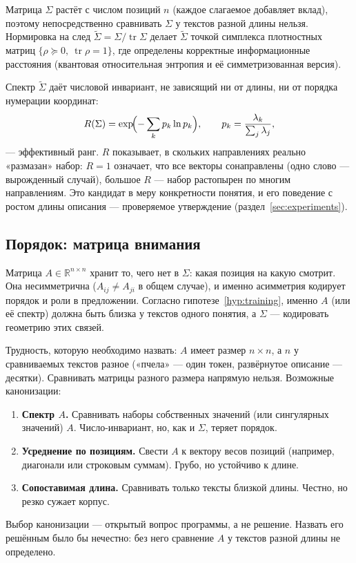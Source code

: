 \documentclass[11pt,a4paper]{article}
\theoremstyle{definition}
\theoremstyle{plain}
\newcommand{\R}{\mathbb{R}}
\DeclareMathOperator{\tr}{tr}
\begin{document}
Матрица $\Sigma$ растёт с числом позиций $n$ (каждое слагаемое добавляет вклад), поэтому
непосредственно сравнивать $\Sigma$ у текстов разной длины нельзя. Нормировка на след
$\tilde\Sigma=\Sigma/\tr\Sigma$ делает $\tilde\Sigma$ точкой симплекса плотностных матриц
$\{\rho\succeq0,\ \tr\rho=1\}$, где определены корректные информационные расстояния
(квантовая относительная энтропия и её симметризованная версия).

Спектр $\tilde\Sigma$ даёт числовой инвариант, не зависящий ни от длины, ни от порядка
нумерации координат:
\[
R(\Sigma)=\exp\!\Bigl(-\sum_k p_k\ln p_k\Bigr),\qquad p_k=\frac{\lambda_k}{\sum_j\lambda_j},
\]
--- эффективный ранг. $R$ показывает, в скольких направлениях реально «размазан» набор: $R=1$
означает, что все векторы сонаправлены (одно слово — вырожденный случай), большое $R$ —
набор растопырен по многим направлениям. Это кандидат в меру конкретности понятия, и его
поведение с ростом длины описания — проверяемое утверждение (раздел~\ref{sec:experiments}).

\subsection{Порядок: матрица внимания}\label{sec:order}

Матрица $A\in\R^{n\times n}$ хранит то, чего нет в $\Sigma$: какая позиция на какую смотрит.
Она несимметрична ($A_{ij}\ne A_{ji}$ в общем случае), и именно асимметрия кодирует порядок и
роли в предложении. Согласно гипотезе~\ref{hyp:training}, именно $A$ (или её спектр) должна
быть близка у текстов одного понятия, а $\Sigma$ — кодировать геометрию этих связей.

Трудность, которую необходимо назвать: $A$ имеет размер $n\times n$, а $n$ у сравниваемых
текстов разное («пчела» — один токен, развёрнутое описание — десятки). Сравнивать матрицы
разного размера напрямую нельзя. Возможные канонизации:
\begin{enumerate}[label=(\arabic*)]
\item \textbf{Спектр $A$.} Сравнивать наборы собственных значений (или сингулярных значений)
$A$. Число-инвариант, но, как и $\Sigma$, теряет порядок.
\item \textbf{Усреднение по позициям.} Свести $A$ к вектору весов позиций (например, диагонали
или строковым суммам). Грубо, но устойчиво к длине.
\item \textbf{Сопоставимая длина.} Сравнивать только тексты близкой длины. Честно, но резко
сужает корпус.
\end{enumerate}
Выбор канонизации — открытый вопрос программы, а не решение. Назвать его решённым было бы
нечестно: без него сравнение $A$ у текстов разной длины не определено.
\end{document}
